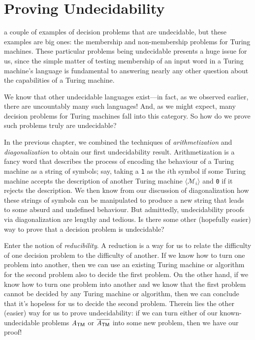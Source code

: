 \chapter{Proving Undecidability}

 a couple of examples of decision problems that are undecidable, but these examples are big ones: the membership and non-membership problems for Turing machines. These particular problems being undecidable presents a huge issue for us, since the simple matter of testing membership of an input word in a Turing machine's language is fundamental to answering nearly any other question about the capabilities of a Turing machine.

We know that other undecidable languages exist---in fact, as we observed earlier, there are uncountably many such languages! And, as we might expect, many decision problems for Turing machines fall into this category. So how do we prove such problems truly are undecidable?

In the previous chapter, we combined the techniques of \emph{arithmetization} and \emph{diagonalization} to obtain our first undecidability result. Arithmetization is a fancy word that describes the process of encoding the behaviour of a Turing machine as a string of symbols; say, taking a \texttt{1} as the $i$th symbol if some Turing machine accepts the description of another Turing machine $\langle \mathcal{M}_{i} \rangle$ and \texttt{0} if it rejects the description. We then know from our discussion of diagonalization how these strings of symbols can be manipulated to produce a new string that leads to some absurd and undefined behaviour. But admittedly, undecidability proofs via diagonalization are lengthy and tedious. Is there some other (hopefully easier) way to prove that a decision problem is undecidable?

Enter the notion of \emph{reducibility}. A reduction is a way for us to relate the difficulty of one decision problem to the difficulty of another. If we know how to turn one problem into another, then we can use an existing Turing machine or algorithm for the second problem also to decide the first problem. On the other hand, if we know how to turn one problem into another and we know that the first problem cannot be decided by any Turing machine or algorithm, then we can conclude that it's hopeless for us to decide the second problem. Therein lies the other (easier) way for us to prove undecidability: if we can turn either of our known-undecidable problems $\mathit{A}_{\textsf{TM}}$ or $\overline{\mathit{A}_{\textsf{TM}}}$ into some new problem, then we have our proof!

